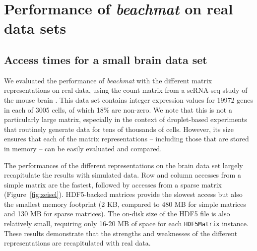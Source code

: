 \documentclass[10pt,letterpaper]{article}
\newcommand{\beachmat}{\textit{beachmat}}
\newcommand{\code}[1]{\texttt{#1}}
\begin{document}

\section*{Performance of \beachmat{} on real data sets}

\subsection*{Access times for a small brain data set}
We evaluated the performance of \beachmat{} with the different matrix representations on real data, using the count matrix from a scRNA-seq study of the mouse brain \cite{zeisel2015brain}.
This data set contains integer expression values for 19972 genes in each of 3005 cells, of which 18\% are non-zero.
We note that this is not a particularly large matrix, especially in the context of droplet-based experiments that routinely generate data for tens of thousands of cells.
However, its size ensures that each of the matrix representations -- including those that are stored in memory -- can be easily evaluated and compared.

The performances of the different representations on the brain data set largely recapitulate the results with simulated data.
Row and column accesses from a simple matrix are the fastest, followed by accesses from a sparse matrix (Figure~\ref{fig:zeisel}).
HDF5-backed matrices provide the slowest access but also the smallest memory footprint (2 KB, compared to 480 MB for simple matrices and 130 MB for sparse matrices).
The on-disk size of the HDF5 file is also relatively small, requiring only 16-20 MB of space for each \code{HDF5Matrix} instance. 
These results demonstrate that the strengths and weaknesses of the different representations are recapitulated with real data.
\end{document}

